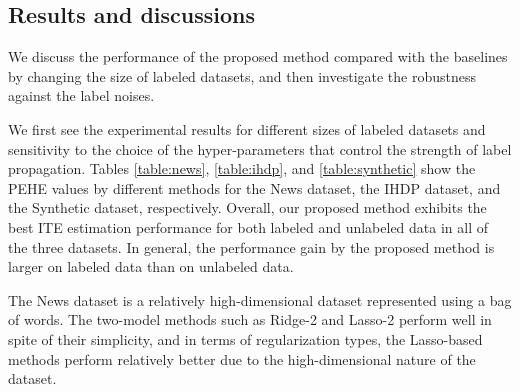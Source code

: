 \subsection{Results and discussions}
We discuss the performance of the proposed method compared with the baselines by changing the size of labeled datasets, and then investigate the robustness against the label noises. 

We first see the experimental results for different sizes of labeled datasets and sensitivity to the choice of the hyper-parameters that control the strength of label propagation. 
Tables \ref{table:news}, \ref{table:ihdp}, and \ref{table:synthetic} show the PEHE values by different methods for the News dataset, the IHDP dataset, and the Synthetic dataset, respectively. 
Overall, our proposed method exhibits the best ITE estimation performance for both labeled and unlabeled data in all of the three datasets.
In general, the performance gain by the proposed method is larger on labeled data than on unlabeled data. 

The News dataset is a relatively high-dimensional dataset represented using a bag of words.
The two-model methods such as Ridge-2 and Lasso-2 perform well in spite of their simplicity, and in terms of regularization types, the Lasso-based methods perform relatively better due to the high-dimensional nature of the dataset. 

